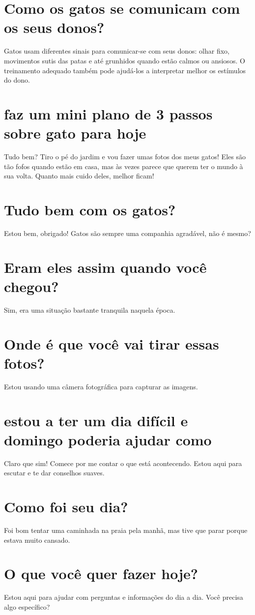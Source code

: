 \documentclass[11pt,a4paper]{article}
\begin{document}
\section{Como os gatos se comunicam com os seus donos?}
Gatos usam diferentes sinais para comunicar-se com seus donos: olhar fixo, movimentos sutis das patas e até grunhidos quando estão calmos ou ansiosos. O treinamento adequado também pode ajudá-los a interpretar melhor os estímulos do dono.

\section{faz um mini plano de 3 passos sobre gato para hoje}
Tudo bem? Tiro o pé do jardim e vou fazer umas fotos dos meus gatos! Eles são tão fofos quando estão em casa, mas às vezes parece que querem ter o mundo à sua volta. Quanto mais cuido deles, melhor ficam!

\section{Tudo bem com os gatos?}
Estou bem, obrigado! Gatos são sempre uma companhia agradável, não é mesmo?

\section{Eram eles assim quando você chegou?}
Sim, era uma situação bastante tranquila naquela época.

\section{Onde é que você vai tirar essas fotos?}
Estou usando uma câmera fotográfica para capturar as imagens.

\section{estou a ter um dia difícil e domingo poderia ajudar como}
Claro que sim! Comece por me contar o que está acontecendo. Estou aqui para escutar e te dar conselhos suaves.

\section{Como foi seu dia?}
Foi bom tentar uma caminhada na praia pela manhã, mas tive que parar porque estava muito cansado.

\section{O que você quer fazer hoje?}
Estou aqui para ajudar com perguntas e informações do dia a dia. Você precisa algo específico?
\end{document}
